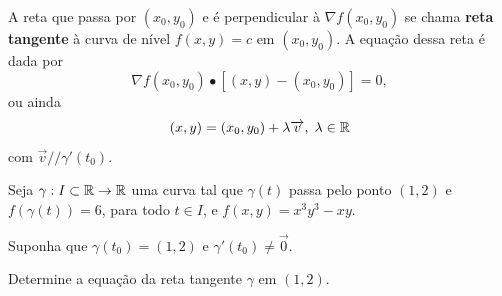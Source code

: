 \begin{definition}
    A reta que passa por \((x_0,y_0)\) e é perpendicular à \(\nabla f(x_0,y_0)\) se chama \textbf{reta tangente} à curva de nível \(f(x,y) = c\) em \((x_0,y_0)\). A equação dessa reta é dada por \[\nabla f(x_0,y_0)\bullet[(x,y) - (x_0,y_0)] = 0,\] ou ainda \[(x,y) = (x_0,y_0) + \lambda\overrightarrow{v},\; \lambda\in\mathbb{R}\] com \(\overrightarrow{v} // \gamma'(t_0).\)
\end{definition}

\begin{example}
    Seja \(\gamma: I\subset\mathbb{R} \to \mathbb{R}\) uma curva tal que \(\gamma(t)\) passa pelo ponto \((1,2)\) e \(f(\gamma(t)) = 6\), para todo \(t\in I\), e \(f(x,y) = x^3 y^3 - xy\).

    Suponha que \(\gamma(t_0) = (1,2)\) e \(\gamma'(t_0)\neq\overrightarrow{0}\).

    Determine a equação da reta tangente \(\gamma\) em \((1,2)\).


\end{example}
